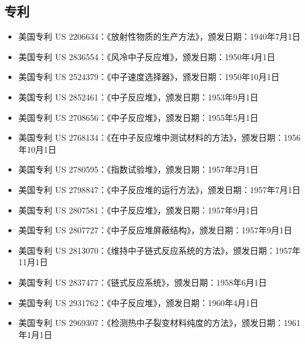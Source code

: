 \subsection{专利}
\begin{itemize}
\item 美国专利 US 2206634：《放射性物质的生产方法》，颁发日期：1940年7月1日
\item 美国专利 US 2836554：《风冷中子反应堆》，颁发日期：1950年4月1日
\item 美国专利 US 2524379：《中子速度选择器》，颁发日期：1950年10月1日
\item 美国专利 US 2852461：《中子反应堆》，颁发日期：1953年9月1日
\item 美国专利 US 2708656：《中子反应堆》，颁发日期：1955年5月1日
\item 美国专利 US 2768134：《在中子反应堆中测试材料的方法》，颁发日期：1956年10月1日
\item 美国专利 US 2780595：《指数试验堆》，颁发日期：1957年2月1日
\item 美国专利 US 2798847：《中子反应堆的运行方法》，颁发日期：1957年7月1日
\item 美国专利 US 2807581：《中子反应堆》，颁发日期：1957年9月1日
\item 美国专利 US 2807727：《中子反应堆屏蔽结构》，颁发日期：1957年9月1日
\item 美国专利 US 2813070：《维持中子链式反应系统的方法》，颁发日期：1957年11月1日
\item 美国专利 US 2837477：《链式反应系统》，颁发日期：1958年6月1日
\item 美国专利 US 2931762：《中子反应堆》，颁发日期：1960年4月1日
\item 美国专利 US 2969307：《检测热中子裂变材料纯度的方法》，颁发日期：1961年1月1日
\end{itemize}
